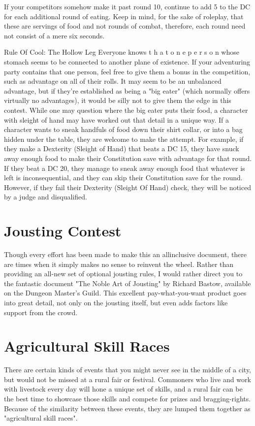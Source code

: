 \documentclass[10pt,a4paper,twoside,twocolumn,openany,bg=print,nodeprecatedcode]{dndbook}
\begin{document}
If your competitors somehow make it past round 10, continue to add 5 to the DC for each additional round of eating. Keep in mind, for the sake of roleplay, that these are servings of food and not rounds of combat, therefore, each round need not consist of a mere six seconds.
\begin{DndComment}{Rule Of Cool: The Hollow Leg}
Everyone knows t h a t o n e p e r s o n whose stomach seems to be connected to another plane of existence. If your adventuring party contains that one person, feel free to give them a bonus in the competition, such as advantage on all of their rolls. It may seem to be an unbalanced advantage, but if they're established as being a "big eater" (which normally offers virtually no advantages), it would be silly not to give them the edge in this contest.
While one may question where the big eater puts their food, a character with sleight of hand may have worked out that detail in a unique way. If a character wants to sneak handfuls of food down their shirt collar, or into a bag hidden under the table, they are welcome to make the attempt. For example, if they make a Dexterity (Sleight of Hand) that beats a DC 15, they have snuck away enough food to make their Constitution save with advantage for that round. If they beat a DC 20, they manage to sneak away enough food that whatever is left is inconsequential, and they can skip their Constitution save for the round. However, if they fail their Dexterity (Sleight Of Hand) check, they will be noticed by a judge and disqualified.
\end{DndComment}

\section{Jousting Contest}
Though every effort has been made to make this an allinclusive document, there are times when it simply makes no sense to reinvent the wheel. Rather than providing an all-new set of optional jousting rules, I would rather direct you to the fantastic document "The Noble Art of Jousting" by Richard Bastow, available on the Dungeon Master's Guild. This excellent pay-what-you-want product goes into great detail, not only on the jousting itself, but even adds factors like support from the crowd. 
\section{Agricultural Skill Races}
There are certain kinds of events that you might never see in the middle of a city, but would not be missed at a rural fair or festival. Commoners who live and work with livestock every day will hone a unique set of skills, and a rural fair can be the best time to showcase those skills and compete for prizes and bragging-rights. Because of the similarity between these events, they are lumped them together as "agricultural skill races".
\end{document}
